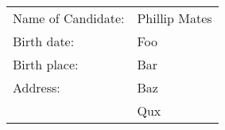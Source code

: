 \begin{lastpage}
\thispagestyle{empty}
\begin{center}
\vspace{1in}
\begin{minipage}{3in}
  \begin{spacing}{2}
    \begin{tabular}{l l}
      Name of Candidate: & Phillip Mates \\
      Birth date: & Foo\\
      Birth place: & Bar \\
      Address: &  Baz\\
      & Qux
    \end{tabular}
  \end{spacing}
\end{minipage}
\end{center}


\end{lastpage}
